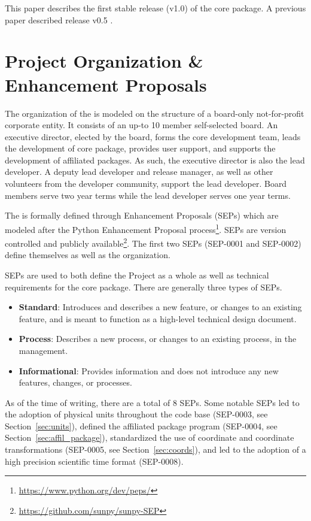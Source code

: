 This paper describes the first stable release (v1.0) of the core package. A previous paper described release v0.5 \citep{Community:2015cy}.

\section{Project Organization \& Enhancement Proposals}

The organization of the \sunpyproj is modeled on the structure of a board-only not-for-profit corporate entity. 
It consists of an up-to 10 member self-selected board. 
An executive director, elected by the board, forms the core development team, leads the development of \sunpy core package, provides user support, and supports the development of affiliated packages. 
As such, the executive director is also the \sunpy lead developer.
A deputy lead developer and release manager, as well as other volunteers from the developer community, support the lead developer.
Board members serve two year terms while the lead developer serves one year terms. 

The \sunpyproj is formally defined through \sunpy Enhancement Proposals (SEPs) which are modeled after the Python Enhancement Proposal process\footnote{\url{https://www.python.org/dev/peps/}}.
SEPs are version controlled and publicly available\footnote{\url{https://github.com/sunpy/sunpy-SEP}}. The first two SEPs (SEP-0001 and SEP-0002) define themselves as well as the \sunpy organization. 

SEPs are used to both define the Project as a whole as well as technical requirements for the \sunpypkg core package. 
There are generally three types of SEPs. 
\begin{itemize}
    \item \textbf{Standard}: Introduces and describes a new feature, or changes to an existing feature, and is meant to function as a high-level technical design document.
    \item \textbf{Process}: Describes a new process, or changes to an existing process, in the \sunpyproj management.
    \item \textbf{Informational}: Provides information and does not introduce any new features, changes, or processes.
\end{itemize}

As of the time of writing, there are a total of 8 SEPs. 
Some notable SEPs led to the adoption of physical units throughout the code base (SEP-0003, see Section~\ref{sec:units}), defined the affiliated package program (SEP-0004, see Section~\ref{sec:affil_package}), standardized the use of coordinate and coordinate transformations (SEP-0005, see Section~\ref{sec:coords}), and led to the adoption of a high precision scientific time format (SEP-0008).

